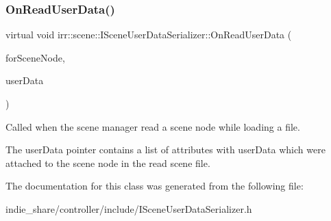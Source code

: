 \subsubsection{\texorpdfstring{On\+Read\+User\+Data()}{OnReadUserData()}}
{\footnotesize\ttfamily virtual void irr\+::scene\+::\+I\+Scene\+User\+Data\+Serializer\+::\+On\+Read\+User\+Data (\begin{DoxyParamCaption}\item[{\hyperlink{classirr_1_1scene_1_1ISceneNode}{I\+Scene\+Node} $\ast$}]{for\+Scene\+Node,  }\item[{\hyperlink{classirr_1_1io_1_1IAttributes}{io\+::\+I\+Attributes} $\ast$}]{user\+Data }\end{DoxyParamCaption})\hspace{0.3cm}{\ttfamily [pure virtual]}}



Called when the scene manager read a scene node while loading a file. 

The user\+Data pointer contains a list of attributes with user\+Data which were attached to the scene node in the read scene file. 

The documentation for this class was generated from the following file\+:\begin{DoxyCompactItemize}
\item 
indie\+\_\+share/controller/include/I\+Scene\+User\+Data\+Serializer.\+h\end{DoxyCompactItemize}
